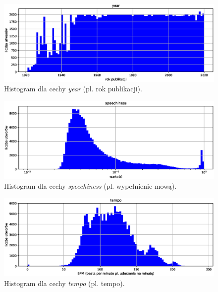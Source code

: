 \documentclass[a4paper,11pt]{article}
\begin{document}
    \smallskip

    \begin{figure}[H]
        \label{fig:year}
        \centering
        \includegraphics[width=\textwidth]{year}
        \caption{Histogram dla cechy \textit{year} (pl. rok publikacji).}
    \end{figure}

    \smallskip

    \begin{figure}[H]
        \label{fig:speechiness}
        \centering
        \includegraphics[width=\textwidth]{speechiness}
        \caption{Histogram dla cechy \textit{speechiness} (pl. wypełnienie mową).}
    \end{figure}

    \smallskip

    \begin{figure}[H]
        \label{fig:tempo}
        \centering
        \includegraphics[width=\textwidth]{tempo}
        \caption{Histogram dla cechy \textit{tempo} (pl. tempo).}
    \end{figure}
\end{document}
